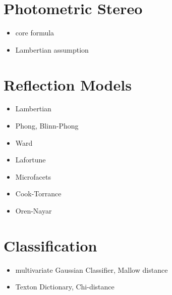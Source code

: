 \hypertarget{Approach}{
\section{Photometric Stereo}\label{PhotometricStereo}
}

\begin{itemize}
	\item{core formula}
	\item{Lambertian assumption}
\end{itemize}

\section{Reflection Models}
\begin{itemize}
	\item{Lambertian}
	\item{Phong, Blinn-Phong}
	\item{Ward}
	\item{Lafortune}
	\item{Microfacets}
	\item{Cook-Torrance}
	\item{Oren-Nayar}
\end{itemize}



\section{Classification}
\begin{itemize}
	\item{multivariate Gaussian Classifier, Mallow distance}
	\item{Texton Dictionary, Chi-distance}
\end{itemize}

